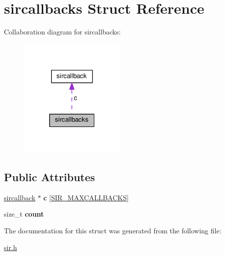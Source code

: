 \hypertarget{structsircallbacks}{}\section{sircallbacks Struct Reference}
\label{structsircallbacks}


Collaboration diagram for sircallbacks\+:\nopagebreak
\begin{figure}[H]
\begin{center}
\leavevmode
\includegraphics[width=148pt]{structsircallbacks__coll__graph}
\end{center}
\end{figure}
\subsection*{Public Attributes}
\begin{DoxyCompactItemize}
\item 
\hyperlink{structsircallback}{sircallback} $\ast$ {\bfseries c} \mbox{[}\hyperlink{sir_8h_a37364e1ca242c22f3b3d10949f9d78d9}{S\+I\+R\+\_\+\+M\+A\+X\+C\+A\+L\+L\+B\+A\+C\+KS}\mbox{]}\hypertarget{structsircallbacks_a6e31f58637668ff6b9c4829f5a1ac4d7}{}\label{structsircallbacks_a6e31f58637668ff6b9c4829f5a1ac4d7}

\item 
size\+\_\+t {\bfseries count}\hypertarget{structsircallbacks_a2da7cd36b0b3db1ef158a700b4d61f07}{}\label{structsircallbacks_a2da7cd36b0b3db1ef158a700b4d61f07}

\end{DoxyCompactItemize}


The documentation for this struct was generated from the following file\+:\begin{DoxyCompactItemize}
\item 
\hyperlink{sir_8h}{sir.\+h}\end{DoxyCompactItemize}
